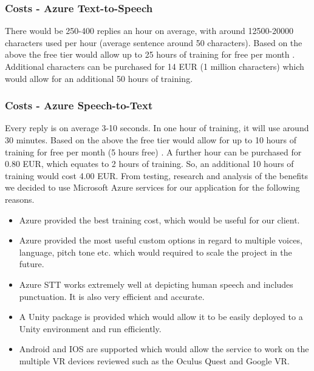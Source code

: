 \subsubsection{Costs - Azure Text-to-Speech}
There would be 250-400 replies an hour on average, with around 12500-20000 characters used per hour (average sentence around 50 characters). Based on the above the free tier would allow up to 25 hours of training for free per month \cite{azurespeechprice}. Additional characters can be purchased for 14 EUR (1 million characters) which would allow for an additional 50 hours of training.

\subsubsection{Costs - Azure Speech-to-Text}
Every reply is on average 3-10 seconds. In one hour of training, it will use around 30 minutes. Based on the above the free tier would allow for up to 10 hours of training for free per month (5 hours free) \cite{azurespeechprice}. A further hour can be purchased for 0.80 EUR, which equates to 2 hours of training. So, an additional 10 hours of training would cost 4.00 EUR.
\newline\newline
From testing, research and analysis of the benefits we decided to use Microsoft Azure services for our application for the following reasons.

\begin{itemize}
  \item Azure provided the best training cost, which would be useful for our client.
  \item Azure provided the most useful custom options in regard to multiple voices, language, pitch tone etc. which would required to scale the project in the future.
  \item Azure STT works extremely well at depicting human speech and includes punctuation. It is also very efficient and accurate.
  \item A Unity package is provided which would allow it to be easily deployed to a Unity environment and run efficiently.
  \item Android and IOS are supported which would allow the service to work on the multiple VR devices reviewed such as the Oculus Quest and Google VR.
\end{itemize}

